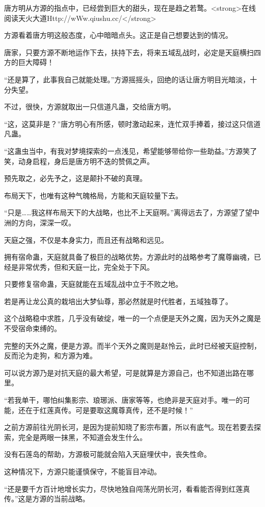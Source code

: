 \begin{this_body}
唐方明从方源的指点中，已经尝到巨大的甜头，现在是趋之若鹜。<strong>在线阅读天火大道Http://wWw.qiushu.cc/</strong>

方源看着唐方明这般态度，心中暗暗点头。这正是自己想要达到的情况。

唐家，只要方源不断地运作下去，扶持下去，将来五域乱战时，必定是天庭横扫四方的巨大障碍！

“还是算了，此事我自己就能处理。”方源摇摇头，回绝的话让唐方明目光暗淡，十分失望。

不过，很快，方源就取出一只信道凡蛊，交给唐方明。

“这，这莫非是？”唐方明心有所感，顿时激动起来，连忙双手捧着，接过这只信道凡蛊。

“这蛊虫当中，有我对梦境探索的一点浅见，希望能够带给你一些助益。”方源笑了笑，动身启程，身后是唐方明不迭的赞佩之声。

预先取之，必先予之，这是颠扑不破的真理。

布局天下，也唯有这种气魄格局，方能和天庭较量下去。

“只是……我这样布局天下的大战略，也比不上天庭啊。”离得远去了，方源望了望中洲的方向，深深一叹。

天庭之强，不仅是本身实力，而且还有战略和远见。

拥有宿命蛊，天庭就具备了极巨的战略优势。方源此时的战略参考了魔尊幽魂，已经是非常优秀，但和天庭一比，完全处于下风。

只要修复宿命蛊，天庭就能在五域乱战中立于不败之地。

若是再让龙公真的栽培出大梦仙尊，那必然就是时代胜者，五域独尊了。

这个战略稳中求胜，几乎没有破绽，唯一的一个点便是天外之魔，因为天外之魔是不受宿命束缚的。

完整的天外之魔，便是方源。而半个天外之魔则是赵怜云，此时已经被天庭控制，反而沦为走狗，和方源为难。

可以说方源乃是对抗天庭的最大希望，可是就算是方源自己，也不知道出路在哪里。

“若我单干，哪怕纠集影宗、琅琊派、唐家等等，也绝非是天庭对手。唯一的可能，还在于红莲真传。可是要取这魔尊真传，还不是时候！”

之前方源前往光阴长河，是因为提前知晓了影宗布置，所以有底气。现在若要去探索，完全是两眼一抹黑，不知道会发生什么。

没有石莲岛的帮助，方源极可能就会陷入天庭埋伏中，丧失性命。

这种情况下，方源只能谨慎保守，不能盲目冲动。

“还是要千方百计地增长实力，尽快地独自闯荡光阴长河，看看能否得到红莲真传。”这是方源的当前战略。


\end{this_body}
